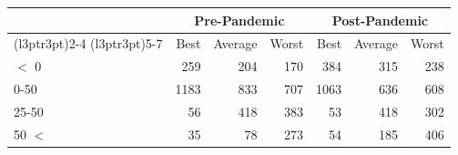 
\begin{tabular}[t]{lrrrrrr}
\toprule
\multicolumn{1}{c}{ } & \multicolumn{3}{c}{Pre-Pandemic} & \multicolumn{3}{c}{Post-Pandemic} \\
\cmidrule(l{3pt}r{3pt}){2-4} \cmidrule(l{3pt}r{3pt}){5-7}
 & Best & Average & Worst & Best & Average & Worst\\
\midrule
$<$ 0 & 259 & 204 & 170 & 384 & 315 & 238\\
0-50 & 1183 & 833 & 707 & 1063 & 636 & 608\\
25-50 & 56 & 418 & 383 & 53 & 418 & 302\\
50 $<$ & 35 & 78 & 273 & 54 & 185 & 406\\
\bottomrule
\end{tabular}
